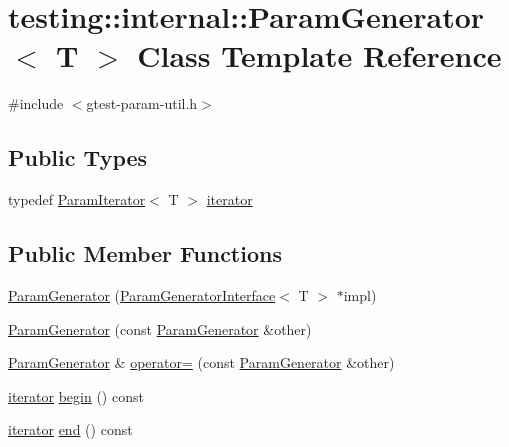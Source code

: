 \hypertarget{classtesting_1_1internal_1_1ParamGenerator}{}\section{testing\+::internal\+::Param\+Generator$<$ T $>$ Class Template Reference}
\label{classtesting_1_1internal_1_1ParamGenerator}


{\ttfamily \#include $<$gtest-\/param-\/util.\+h$>$}

\subsection*{Public Types}
\begin{DoxyCompactItemize}
\item 
typedef \mbox{\hyperlink{classtesting_1_1internal_1_1ParamIterator}{Param\+Iterator}}$<$ T $>$ \mbox{\hyperlink{classtesting_1_1internal_1_1ParamGenerator_a448b08a8eaae1f1d27840d4dbd66c357}{iterator}}
\end{DoxyCompactItemize}
\subsection*{Public Member Functions}
\begin{DoxyCompactItemize}
\item 
\mbox{\hyperlink{classtesting_1_1internal_1_1ParamGenerator_a6b017d4d030927714d495ee95ae92fbc}{Param\+Generator}} (\mbox{\hyperlink{classtesting_1_1internal_1_1ParamGeneratorInterface}{Param\+Generator\+Interface}}$<$ T $>$ $\ast$impl)
\item 
\mbox{\hyperlink{classtesting_1_1internal_1_1ParamGenerator_a5891d25c31919b3099489f8bbcd58b5e}{Param\+Generator}} (const \mbox{\hyperlink{classtesting_1_1internal_1_1ParamGenerator}{Param\+Generator}} \&other)
\item 
\mbox{\hyperlink{classtesting_1_1internal_1_1ParamGenerator}{Param\+Generator}} \& \mbox{\hyperlink{classtesting_1_1internal_1_1ParamGenerator_a590a03c6e0a3a3ac6279943ad1f01dc8}{operator=}} (const \mbox{\hyperlink{classtesting_1_1internal_1_1ParamGenerator}{Param\+Generator}} \&other)
\item 
\mbox{\hyperlink{classtesting_1_1internal_1_1ParamGenerator_a448b08a8eaae1f1d27840d4dbd66c357}{iterator}} \mbox{\hyperlink{classtesting_1_1internal_1_1ParamGenerator_a14e735c8bd113556ae905a560cd2d607}{begin}} () const
\item 
\mbox{\hyperlink{classtesting_1_1internal_1_1ParamGenerator_a448b08a8eaae1f1d27840d4dbd66c357}{iterator}} \mbox{\hyperlink{classtesting_1_1internal_1_1ParamGenerator_aaf8f75df1099a07ff771a550b48f9fbe}{end}} () const
\end{DoxyCompactItemize}


